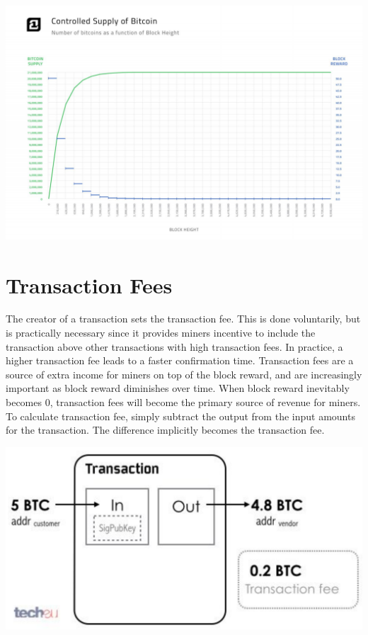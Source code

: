 \documentclass[11pt]{article}
\begin{document}
    \includegraphics[scale=0.4]{supply_cap} \\
    
    \section*{Transaction Fees}
    
    The creator of a transaction sets the transaction fee. This is done voluntarily, but is practically necessary since it provides miners incentive to include the transaction above other transactions with high transaction fees. In practice, a higher transaction fee leads to a faster confirmation time. Transaction fees are a source of extra income for miners on top of the block reward, and are increasingly important as block reward diminishes over time. When block reward inevitably becomes 0, transaction fees will become the primary source of revenue for miners. To calculate transaction fee, simply subtract the output from the input amounts for the transaction. The difference implicitly becomes the transaction fee. 
    
    \includegraphics[scale=0.2]{transaction_fee} \\
    
\end{document}
